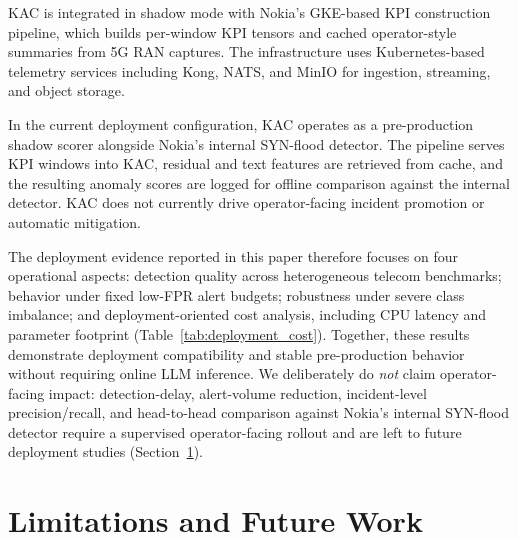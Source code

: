 \documentclass[conference]{IEEEtran}
\begin{document}
KAC is integrated in shadow mode with Nokia's GKE-based KPI construction pipeline, which builds per-window KPI tensors and cached operator-style summaries from 5G RAN captures. The infrastructure uses Kubernetes-based telemetry services including Kong, NATS, and MinIO for ingestion, streaming, and object storage.

In the current deployment configuration, KAC operates as a pre-production shadow scorer alongside Nokia's internal SYN-flood detector. The pipeline serves KPI windows into KAC, residual and text features are retrieved from cache, and the resulting anomaly scores are logged for offline comparison against the internal detector. KAC does not currently drive operator-facing incident promotion or automatic mitigation.

The deployment evidence reported in this paper therefore focuses on four operational aspects: detection quality across heterogeneous telecom benchmarks; behavior under fixed low-FPR alert budgets; robustness under severe class imbalance; and deployment-oriented cost analysis, including CPU latency and parameter footprint (Table~\ref{tab:deployment_cost}). Together, these results demonstrate deployment compatibility and stable pre-production behavior without requiring online LLM inference. We deliberately do \emph{not} claim operator-facing impact: detection-delay, alert-volume reduction, incident-level precision/recall, and head-to-head comparison against Nokia's internal SYN-flood detector require a supervised operator-facing rollout and are left to future deployment studies (Section~\ref{sec:limitations}).

\section{Limitations and Future Work}
\label{sec:limitations}
\end{document}
